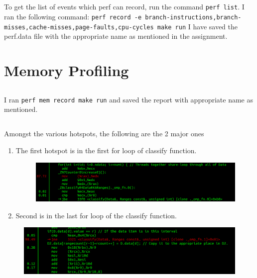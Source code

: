 \documentclass{article}
\begin{document}
\subsection{}
To get the list of events which perf can record, run the command \texttt{perf list}. I ran the following command: \texttt{perf record -e branch-instructions,branch-misses,cache-misses,page-faults,cpu-cycles make run}
I have saved the perf.data file with the appropriate name as mentioned in the assignment.

\section{Memory Profiling}

\subsection{}
I ran \texttt{perf mem record make run} and saved the report with appropriate name as mentioned.

\subsection{}
Amongst the various hotspots, the following are the 2 major ones

\begin{enumerate}
    \item The first hotspot is in the first for loop of classify function.
\begin{figure}[H]
    \centering
    \includegraphics[width=1\textwidth]{images/hot2.png}
    \end{figure}
    \item Second is in the last for loop of the classify function.
\end{enumerate}

\begin{figure}[H]
\centering
\includegraphics[width=1\textwidth]{images/hot1.png}
\end{figure}
\end{document}
